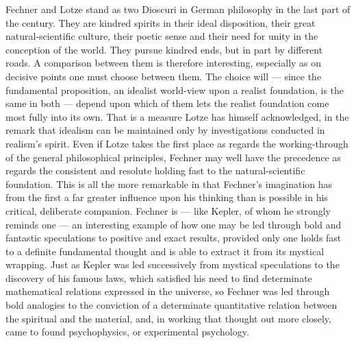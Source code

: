 \documentclass[12pt,a4paper]{book}
\newcommand{\opage}[1]{\marginnote{\footnotesize\textit{[#1]}}}
\begin{document}
Fechner and Lotze stand as two Dioscuri in German philosophy in the last part of
the century. They are kindred spirits in their ideal disposition, their great
natural-scientific culture, their poetic sense and their need for unity in the
conception of the world. They pursue kindred ends, but in part by different
roads. A comparison between them is therefore interesting, especially as on
decisive points one must choose between them. The choice will --- since the
fundamental proposition, an idealist world-view upon a realist foundation, is the
same in both --- depend upon which of them lets the realist foundation come most
fully into its own. That is a measure Lotze has himself acknowledged, in the
remark that idealism can be maintained only by investigations conducted in
realism's spirit. Even if Lotze takes the first place as regards the
working-through of the general philosophical principles, Fechner may well have
the precedence as regards the consistent and \opage{527}resolute holding fast to the
natural-scientific foundation. This is all the more remarkable in that Fechner's
imagination has from the first a far greater influence upon his thinking than is
possible in his critical, deliberate companion. Fechner is --- like Kepler, of
whom he strongly reminds one --- an interesting example of how one may be led
through bold and fantastic speculations to positive and exact results, provided
only one holds fast to a definite fundamental thought and is able to extract it
from its mystical wrapping. Just as Kepler was led successively from mystical
speculations to the discovery of his famous laws, which satisfied his need to
find determinate mathematical relations expressed in the universe, so Fechner was
led through bold analogies to the conviction of a determinate quantitative
relation between the spiritual and the material, and, in working that thought out
more closely, came to found psychophysics, or experimental psychology.
\end{document}
